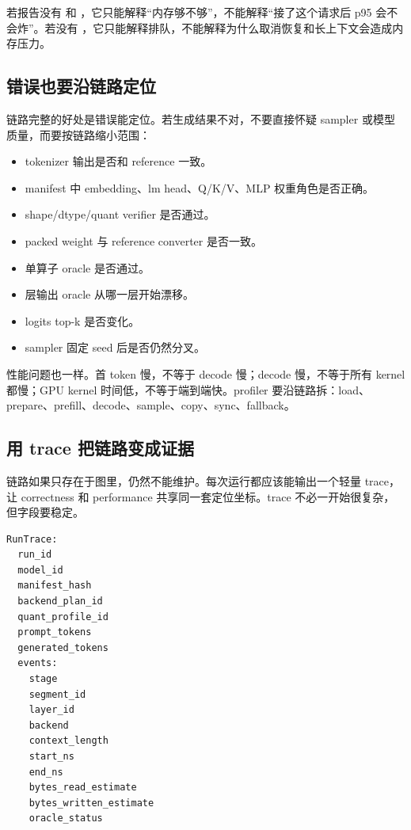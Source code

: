 若报告没有  和 ，它只能解释“内存够不够”，不能解释“接了这个请求后 p95 会不会炸”。若没有 ，它只能解释排队，不能解释为什么取消恢复和长上下文会造成内存压力。

\subsection{错误也要沿链路定位}

链路完整的好处是错误能定位。若生成结果不对，不要直接怀疑 sampler 或模型质量，而要按链路缩小范围：

\begin{itemize}
  \item tokenizer 输出是否和 reference 一致。
  \item manifest 中 embedding、lm head、Q/K/V、MLP 权重角色是否正确。
  \item shape/dtype/quant verifier 是否通过。
  \item packed weight 与 reference converter 是否一致。
  \item 单算子 oracle 是否通过。
  \item 层输出 oracle 从哪一层开始漂移。
  \item logits top-k 是否变化。
  \item sampler 固定 seed 后是否仍然分叉。
\end{itemize}

性能问题也一样。首 token 慢，不等于 decode 慢；decode 慢，不等于所有 kernel 都慢；GPU kernel 时间低，不等于端到端快。profiler 要沿链路拆：load、prepare、prefill、decode、sample、copy、sync、fallback。

\subsection{用 trace 把链路变成证据}

链路如果只存在于图里，仍然不能维护。每次运行都应该能输出一个轻量 trace，让 correctness 和 performance 共享同一套定位坐标。trace 不必一开始很复杂，但字段要稳定。

\begin{lstlisting}[numbers=none,caption={端到端推理 trace 的最小字段}]
RunTrace:
  run_id
  model_id
  manifest_hash
  backend_plan_id
  quant_profile_id
  prompt_tokens
  generated_tokens
  events:
    stage
    segment_id
    layer_id
    backend
    context_length
    start_ns
    end_ns
    bytes_read_estimate
    bytes_written_estimate
    oracle_status
\end{lstlisting}

